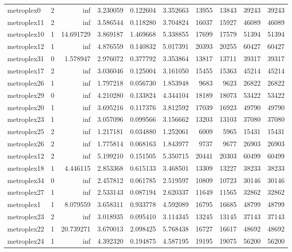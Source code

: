 \begin{longtable}{|l|r|r|r|r|r|r|r|r|r|}
metroplex0 & 2 & inf & 3.230059 & 0.122604 & 3.352663 & 13955 & 13843 & 39243 & 39243 \\
metroplex11 & 2 & inf & 3.586544 & 0.118280 & 3.704824 & 16037 & 15927 & 46089 & 46089 \\
metroplex10 & 1 & 14.691729 & 3.869187 & 1.469668 & 5.338855 & 17699 & 17579 & 51394 & 51394 \\
metroplex12 & 1 & inf & 4.876559 & 0.140832 & 5.017391 & 20393 & 20255 & 60427 & 60427 \\
metroplex31 & 0 & 1.578947 & 2.976072 & 0.377792 & 3.353864 & 13817 & 13711 & 39317 & 39317 \\
metroplex17 & 2 & inf & 3.036046 & 0.125004 & 3.161050 & 15455 & 15363 & 45214 & 45214 \\
metroplex26 & 1 & inf & 1.797218 & 0.056730 & 1.853948 & 9683 & 9623 & 26822 & 26822 \\
metroplex29 & 0 & inf & 4.210280 & 0.133824 & 4.344104 & 18189 & 18073 & 53422 & 53422 \\
metroplex20 & 1 & inf & 3.695216 & 0.117376 & 3.812592 & 17039 & 16923 & 49790 & 49790 \\
metroplex23 & 1 & inf & 3.057096 & 0.099566 & 3.156662 & 13203 & 13103 & 37080 & 37080 \\
metroplex25 & 2 & inf & 1.217181 & 0.034880 & 1.252061 & 6009 & 5965 & 15431 & 15431 \\
metroplex26 & 2 & inf & 1.775814 & 0.068163 & 1.843977 & 9737 & 9677 & 26903 & 26903 \\
metroplex12 & 2 & inf & 5.199210 & 0.151505 & 5.350715 & 20441 & 20303 & 60499 & 60499 \\
metroplex18 & 1 & 4.446115 & 2.853368 & 0.615133 & 3.468501 & 13309 & 13227 & 38233 & 38233 \\
metroplex34 & 0 & inf & 2.457812 & 0.061785 & 2.519597 & 10809 & 10723 & 30146 & 30146 \\
metroplex27 & 1 & inf & 2.533143 & 0.087194 & 2.620337 & 11649 & 11565 & 32862 & 32862 \\
metroplex1 & 1 & 8.079559 & 3.658311 & 0.933778 & 4.592089 & 16795 & 16685 & 48799 & 48799 \\
metroplex23 & 2 & inf & 3.018935 & 0.095410 & 3.114345 & 13245 & 13145 & 37143 & 37143 \\
metroplex22 & 1 & 20.739271 & 3.670013 & 2.098425 & 5.768438 & 16727 & 16617 & 48692 & 48692 \\
metroplex24 & 1 & inf & 4.392320 & 0.194875 & 4.587195 & 19195 & 19075 & 56200 & 56200 \\

\end{longtable}
